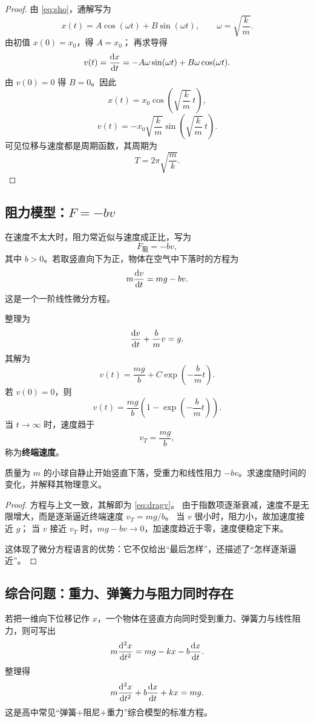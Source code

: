 \begin{proof}
由 \cref{eq:sho}，通解写为
\[
  x(t)=A\cos(\omega t)+B\sin(\omega t),\qquad \omega=\sqrt{\frac{k}{m}}.
\]
由初值 $x(0)=x_0$，得 $A=x_0$；
再求导得
\[
  v(t)=\dv{x}{t}=-A\omega\sin(\omega t)+B\omega\cos(\omega t).
\]
由 $v(0)=0$ 得 $B=0$。因此
\[
  x(t)=x_0\cos\left(\sqrt{\frac{k}{m}}\,t\right),
\]
\[
  v(t)=-x_0\sqrt{\frac{k}{m}}\sin\left(\sqrt{\frac{k}{m}}\,t\right).
\]
可见位移与速度都是周期函数，其周期为
\[
  T=2\pi\sqrt{\frac{m}{k}}.
\]
\end{proof}

\subsection{阻力模型：$F=-bv$}

在速度不太大时，阻力常近似与速度成正比，写为
\[
  F_{\text{阻}}=-bv,
\]
其中 $b>0$。若取竖直向下为正，物体在空气中下落时的方程为
\[
  m\dv{v}{t}=mg-bv.
\]
这是一个一阶线性微分方程。

整理为
\[
  \dv{v}{t}+\frac{b}{m}v=g.
\]
其解为
\[
  v(t)=\frac{mg}{b}+C\exp\left(-\frac{b}{m}t\right).
\]
若 $v(0)=0$，则
\begin{equation}
  v(t)=\frac{mg}{b}\left(1-\exp\left(-\frac{b}{m}t\right)\right).
  \label{eq:dragv}
\end{equation}
当 $t\to\infty$ 时，速度趋于
\[
  v_T=\frac{mg}{b},
\]
称为\textbf{终端速度}。

\begin{example}[线性阻力下的下落]
质量为 $m$ 的小球自静止开始竖直下落，受重力和线性阻力 $-bv$。求速度随时间的变化，并解释其物理意义。
\end{example}

\begin{proof}
方程与上文一致，其解即为 \cref{eq:dragv}。
由于指数项逐渐衰减，速度不是无限增大，而是逐渐逼近终端速度 $v_T=mg/b$。
当 $v$ 很小时，阻力小，故加速度接近 $g$；
当 $v$ 接近 $v_T$ 时，$mg-bv\to 0$，加速度趋近于零，速度便稳定下来。

这体现了微分方程语言的优势：它不仅给出“最后怎样”，还描述了“怎样逐渐逼近”。
\end{proof}

\subsection{综合问题：重力、弹簧力与阻力同时存在}

若把一维向下位移记作 $x$，一个物体在竖直方向同时受到重力、弹簧力与线性阻力，则可写出
\[
  m\dv[2]{x}{t}=mg-kx-b\dv{x}{t}.
\]
整理得
\begin{equation}
  m\dv[2]{x}{t}+b\dv{x}{t}+kx=mg.
  \label{eq:damped-shifted}
\end{equation}
这是高中常见“弹簧+阻尼+重力”综合模型的标准方程。

